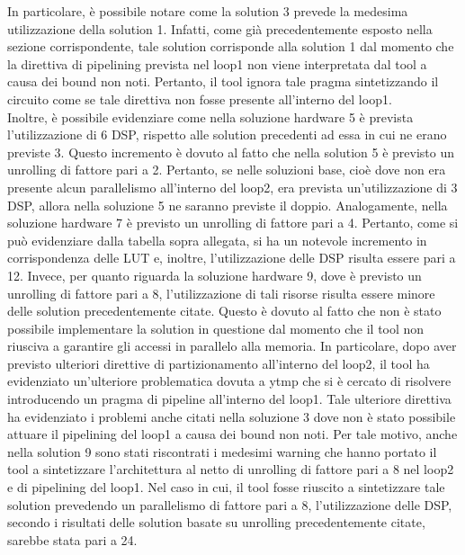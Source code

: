 In particolare, è possibile notare come la solution 3 prevede la medesima utilizzazione della solution 1. Infatti, come già precedentemente esposto nella sezione corrispondente, tale solution corrisponde alla solution 1 dal momento che la direttiva di pipelining prevista nel loop1 non viene interpretata dal tool a causa dei bound non noti. Pertanto, il tool ignora tale pragma sintetizzando il circuito come se tale direttiva non fosse presente all'interno del loop1. 
\\
Inoltre, è possibile evidenziare come nella soluzione hardware 5 è prevista l'utilizzazione di 6 DSP, rispetto alle solution precedenti ad essa in cui ne erano previste 3. Questo incremento è dovuto al fatto che nella solution 5 è previsto un unrolling di fattore pari a 2. Pertanto, se nelle soluzioni base, cioè dove non era presente alcun parallelismo all'interno del loop2, era prevista un'utilizzazione di 3 DSP, allora nella soluzione 5 ne saranno previste il doppio. Analogamente, nella soluzione hardware 7 è previsto un unrolling di fattore pari a 4. Pertanto, come si può evidenziare dalla tabella sopra allegata, si ha un notevole incremento in corrispondenza delle LUT e, inoltre, l'utilizzazione delle DSP risulta essere pari a 12. Invece, per quanto riguarda la soluzione hardware 9, dove è previsto un unrolling di fattore pari a 8, l'utilizzazione di tali risorse risulta essere minore delle solution precedentemente citate. Questo è dovuto al fatto che non è stato possibile implementare la solution in questione dal momento che il tool non riusciva a garantire gli accessi in parallelo alla memoria. In particolare, dopo aver previsto ulteriori direttive di partizionamento all'interno del loop2, il tool ha evidenziato un'ulteriore problematica dovuta a ytmp che si è cercato di risolvere introducendo un pragma di pipeline all'interno del loop1. Tale ulteriore direttiva ha evidenziato i problemi anche citati nella soluzione 3 dove non è stato possibile attuare il pipelining del loop1 a causa dei bound non noti. Per tale motivo, anche nella solution 9 sono stati riscontrati i medesimi warning che hanno portato il tool a sintetizzare l'architettura al netto di unrolling di fattore pari a 8 nel loop2 e di pipelining del loop1. Nel caso in cui, il tool fosse riuscito a sintetizzare tale solution prevedendo un parallelismo di fattore pari a 8, l'utilizzazione delle DSP, secondo i risultati delle solution basate su unrolling precedentemente citate, sarebbe stata pari a 24.
\\
